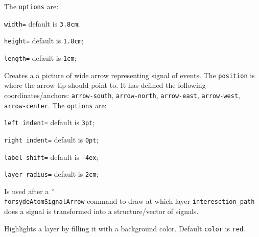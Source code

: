 \noindent The \texttt{options} are:

\begin{optionslist}
\item \texttt{width=} default is \texttt{3.8cm};
\item \texttt{height=} default is \texttt{1.8cm};
\item \texttt{length=} default is \texttt{1cm};
\end{optionslist}


\hspace{1pt}

\noindent Creates a a picture of wide arrow representing signal of events. The \texttt{position} is where the arrow tip should point to. It has defined the following coordinates/anchors: \texttt{arrow-south}, \texttt{arrow-north}, \texttt{arrow-east}, \texttt{arrow-west}, \texttt{arrow-center}. The \texttt{options} are:

\begin{optionslist}
\item \texttt{left indent=} default is \texttt{3pt};
\item \texttt{right indent=} default is \texttt{0pt};
\item \texttt{label shift=} default is \texttt{-4ex};
\item \texttt{layer radius=} default is \texttt{2cm};
\end{optionslist}

\hspace{1pt}

\noindent Is used after a \texttt{\char`\\forsydeAtomSignalArrow} command to draw at which layer \texttt{interesction\_path} does a signal is transformed into a structure/vector of signals.

\vspace{1ex}
\hspace{1pt}

\noindent Highlights a layer by filling it with a background color. Default \texttt{color} is \texttt{red}.

